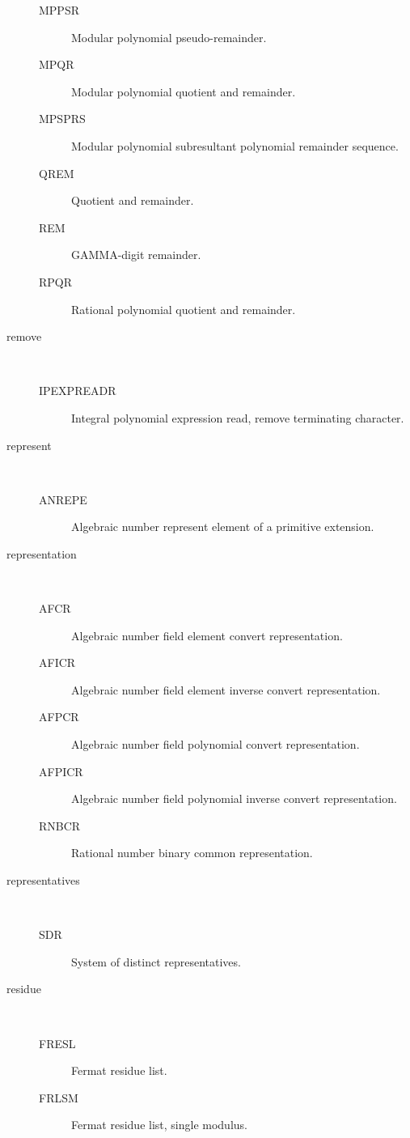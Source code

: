 \begin{description}
\begin{description}
  \item[MPPSR]  Modular polynomial pseudo-remainder.
  \item[MPQR]  Modular polynomial quotient and remainder.
  \item[MPSPRS]  Modular polynomial subresultant polynomial remainder
    sequence.
  \item[QREM]  Quotient and remainder.
  \item[REM]  GAMMA-digit remainder.
  \item[RPQR]  Rational polynomial quotient and remainder.
  \end{description}
\item[remove] \ \ 
  \begin{description}
  \item[IPEXPREADR]  Integral polynomial expression read, remove terminating
    character.
  \end{description}
\item[represent] \ \ 
  \begin{description}
  \item[ANREPE]  Algebraic number represent element of a primitive extension.
  \end{description}
\item[representation] \ \ 
  \begin{description}
  \item[AFCR]  Algebraic number field element convert representation.
  \item[AFICR]  Algebraic number field element inverse convert representation.
  \item[AFPCR]  Algebraic number field polynomial convert representation.
  \item[AFPICR]  Algebraic number field polynomial inverse convert
    representation.
  \item[RNBCR]  Rational number binary common representation.
  \end{description}
\item[representatives] \ \ 
  \begin{description}
  \item[SDR]  System of distinct representatives.
  \end{description}
\item[residue] \ \ 
  \begin{description}
  \item[FRESL]  Fermat residue list.
  \item[FRLSM]  Fermat residue list, single modulus.
  \end{description}

\end{description}

